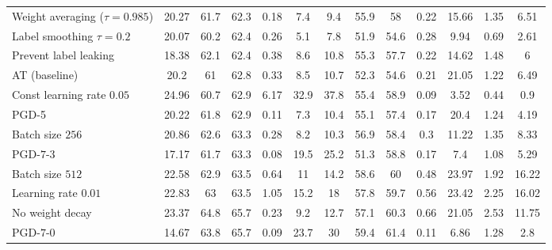 \begin{table}[t]
{\begin{tabularx}{\textwidth}{|X|c|c|c||c|c|c||c|c||c|c|c|c|}
		\rowcolor{colorbrewer1!15}\hspace*{2px} Weight averaging ($\tau{=}0.985$) & 20.27 & 61.7 & 62.3 & 0.18 & 7.4 & 9.4 & 55.9 & 58 & 0.22 & 15.66 & 1.35 & 6.51\\
		\rowcolor{colorbrewer1!15}\hspace*{2px} Label smoothing $\tau{=}0.2$ & 20.07 & 60.2 & 62.4 & 0.26 & 5.1 & 7.8 & 51.9 & 54.6 & 0.28 & 9.94 & 0.69 & 2.61\\
		\rowcolor{colorbrewer1!15}\hspace*{2px} Prevent label leaking & 18.38 & 62.1 & 62.4 & 0.38 & 8.6 & 10.8 & 55.3 & 57.7 & 0.22 & 14.62 & 1.48 & 6\\
		\rowcolor{colorbrewer1!15}\hspace*{2px} AT (baseline) & 20.2 & 61 & 62.8 & 0.33 & 8.5 & 10.7 & 52.3 & 54.6 & 0.21 & 21.05 & 1.22 & 6.49\\
		\hline
		\rowcolor{colorbrewer0!15}\hspace*{2px} Const learning rate $0.05$ & 24.96 & 60.7 & 62.9 & 6.17 & 32.9 & 37.8 & 55.4 & 58.9 & 0.09 & 3.52 & 0.44 & 0.9\\
		\rowcolor{colorbrewer0!15}\hspace*{2px} PGD-5 & 20.22 & 61.8 & 62.9 & 0.11 & 7.3 & 10.4 & 55.1 & 57.4 & 0.17 & 20.4 & 1.24 & 4.19\\
		\rowcolor{colorbrewer0!15}\hspace*{2px} Batch size $256$ & 20.86 & 62.6 & 63.3 & 0.28 & 8.2 & 10.3 & 56.9 & 58.4 & 0.3 & 11.22 & 1.35 & 8.33\\
		\rowcolor{colorbrewer0!15}\hspace*{2px} PGD-$7$-$3$ & 17.17 & 61.7 & 63.3 & 0.08 & 19.5 & 25.2 & 51.3 & 58.8 & 0.17 & 7.4 & 1.08 & 5.29\\
		\rowcolor{colorbrewer0!15}\hspace*{2px} Batch size $512$ & 22.58 & 62.9 & 63.5 & 0.64 & 11 & 14.2 & 58.6 & 60 & 0.48 & 23.97 & 1.92 & 16.22\\
		\rowcolor{colorbrewer0!15}\hspace*{2px} Learning rate $0.01$ & 22.83 & 63 & 63.5 & 1.05 & 15.2 & 18 & 57.8 & 59.7 & 0.56 & 23.42 & 2.25 & 16.02\\
		\rowcolor{colorbrewer0!15}\hspace*{2px} No weight decay & 23.37 & 64.8 & 65.7 & 0.23 & 9.2 & 12.7 & 57.1 & 60.3 & 0.66 & 21.05 & 2.53 & 11.75\\
		\rowcolor{colorbrewer0!15}\hspace*{2px} PGD-$7$-$0$ & 14.67 & 63.8 & 65.7 & 0.09 & 23.7 & 30 & 59.4 & 61.4 & 0.11 & 6.86 & 1.28 & 2.8\\

\end{tabularx}}
\end{table}
